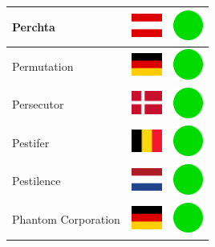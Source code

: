 \documentclass[12pt, a4paper, twoside]{report}
\begin{document}
\begin{center}
\begin{longtable}{|p{5cm}|p{2cm}|p{2cm}|}
 Perchta                                                    & \includegraphics[width=1cm]{../img/flags/at} &   \includegraphics[width=1cm]{../likes/y} \\ \hline
 Permutation                                                & \includegraphics[width=1cm]{../img/flags/de} &   \includegraphics[width=1cm]{../likes/y} \\ \hline
 Persecutor                                                 & \includegraphics[width=1cm]{../img/flags/dk} &   \includegraphics[width=1cm]{../likes/y} \\ \hline
 Pestifer                                                   & \includegraphics[width=1cm]{../img/flags/be} &   \includegraphics[width=1cm]{../likes/y} \\ \hline
 Pestilence                                                 & \includegraphics[width=1cm]{../img/flags/nl} &   \includegraphics[width=1cm]{../likes/y} \\ \hline
 Phantom Corporation                                        & \includegraphics[width=1cm]{../img/flags/de} &   \includegraphics[width=1cm]{../likes/y} \\ \hline

\end{longtable}
\end{center}
\end{document}
